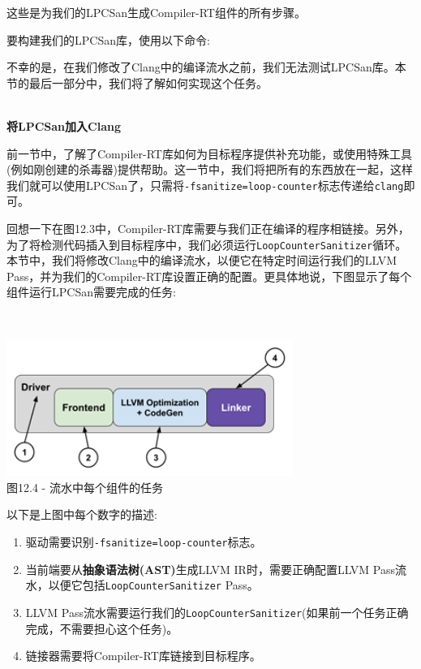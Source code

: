 这些是为我们的LPCSan生成Compiler-RT组件的所有步骤。

要构建我们的LPCSan库，使用以下命令:


不幸的是，在我们修改了Clang中的编译流水之前，我们无法测试LPCSan库。本节的最后一部分中，我们将了解如何实现这个任务。

\hspace*{\fill} \\ %
\noindent
\textbf{将LPCSan加入Clang}

前一节中，了解了Compiler-RT库如何为目标程序提供补充功能，或使用特殊工具(例如刚创建的杀毒器)提供帮助。这一节中，我们将把所有的东西放在一起，这样我们就可以使用LPCSan了，只需将\texttt{-fsanitize=loop-counter}标志传递给\texttt{clang}即可。

回想一下在图12.3中，Compiler-RT库需要与我们正在编译的程序相链接。另外，为了将检测代码插入到目标程序中，我们必须运行\texttt{LoopCounterSanitizer}循环。本节中，我们将修改Clang中的编译流水，以便它在特定时间运行我们的LLVM Pass，并为我们的Compiler-RT库设置正确的配置。更具体地说，下图显示了每个组件运行LPCSan需要完成的任务:

\hspace*{\fill} \\ %
\begin{center}
\includegraphics[width=0.7\textwidth]{content/3/chapter12/images/4.png}\\
图12.4 - 流水中每个组件的任务
\end{center}

以下是上图中每个数字的描述:

\begin{enumerate}
\item 驱动需要识别\texttt{-fsanitize=loop-counter}标志。
\item 当前端要从\textbf{抽象语法树(AST)}生成LLVM IR时，需要正确配置LLVM Pass流水，以便它包括\texttt{LoopCounterSanitizer} Pass。
\item LLVM Pass流水需要运行我们的\texttt{LoopCounterSanitizer}(如果前一个任务正确完成，不需要担心这个任务)。
\item 链接器需要将Compiler-RT库链接到目标程序。
\end{enumerate}

